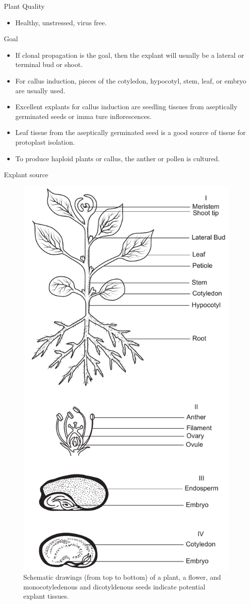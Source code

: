 \documentclass[ignorenonframetext,aspectratio=169]{beamer}
\providecommand{\tightlist}{%
  \setlength{\itemsep}{0pt}\setlength{\parskip}{0pt}}
\begin{document}
\begin{frame}{Plant Quality}
\protect\hypertarget{plant-quality}{}

\begin{itemize}
\tightlist
\item
  Healthy, unstressed, virus free.
\end{itemize}

\end{frame}

\begin{frame}{Goal}
\protect\hypertarget{goal}{}

\begin{itemize}
\tightlist
\item
  If clonal propagation is the goal, then the explant will usually be a
  lateral or terminal bud or shoot.
\item
  For callus induction, pieces of the cotyledon, hypocotyl, stem, leaf,
  or embryo are usually used.
\item
  Excellent explants for callus induction are seedling tissues from
  aseptically germinated seeds or imma ture inflorescences.
\item
  Leaf tissue from the aseptically germinated seed is a good source of
  tissue for protoplast isolation.
\item
  To produce haploid plants or callus, the anther or pollen is cultured.
\end{itemize}

\end{frame}

\begin{frame}{Explant source}
\protect\hypertarget{explant-source}{}

\begin{figure}
\includegraphics[width=0.2\linewidth]{../images/explant_sources} \caption{Schematic drawings (from top to bottom) of a plant, a flower, and monocotyledenous and dicotyldenous seeds indicate potential explant tissues.}\label{fig:explant-source}
\end{figure}

\end{frame}
\end{document}
